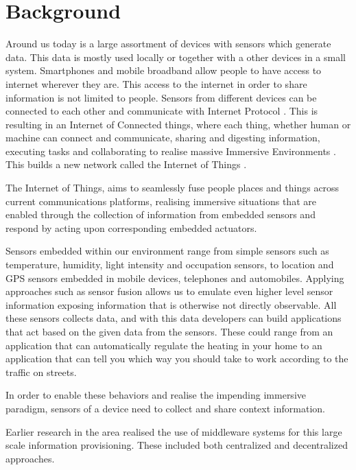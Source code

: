 \section{Background}
Around us today is a large assortment of devices with sensors which generate data. This data is mostly used locally or together with a other devices in a small system. Smartphones and mobile broadband allow people to have access to internet wherever they are. This access to the internet in order to share information is not limited to people. Sensors from different devices can be connected to each other and communicate with Internet Protocol \cite{chui2010internet}. This is resulting in an Internet of Connected things, where each thing, whether human or machine can connect and communicate, sharing and digesting information, executing tasks and collaborating to realise massive Immersive Environments \cite{tan2010future}. This builds a new network called the Internet of Things \cite{tan2010future}. 

The Internet of Things, aims to seamlessly fuse people places and things across current communications platforms, realising immersive situations that are enabled through the collection of information from embedded sensors and respond by acting upon corresponding embedded actuators. 

Sensors embedded within our environment range from simple sensors such as temperature, humidity, light intensity and occupation sensors, to location and GPS sensors embedded in mobile devices, telephones and automobiles. Applying approaches such as sensor fusion allows us to emulate even higher level sensor information exposing information that is otherwise not directly observable. All these sensors collects data, and with this data developers can build applications that act based on the given data from the sensors. These could range from an application that can automatically regulate the heating in your home to an application that can tell you which way you should take to work according to the traffic on streets.

In order to enable these behaviors and realise the impending immersive paradigm, sensors of a device need to collect and share context information. 

Earlier research in the area realised the use of middleware systems for this large scale information provisioning. These included both centralized and decentralized approaches. 

